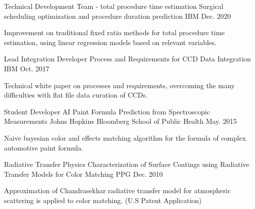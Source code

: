 

\begin{cventries}

  \cventry
    {Technical Development Team - total procedure time estimation} %
    {Surgical scheduling optimization and procedure duration prediction} %
    {IBM} %
    {Dec. 2020} %
    {
      \begin{cvcompactparagraph}
        Improvement on traditional fixed ratio methods for total procedure time estimation, using linear regression models based on relevant variables.
      \end{cvcompactparagraph}
    }

  \cventry
    {Lead Integration Developer} %
    {Process and Requirements for CCD Data Integration} %
    {IBM} %
    {Oct. 2017} %
    {
      \begin{cvcompactparagraph}
        Technical white paper on processes and requirements, overcoming the many difficulties with flat file data curation of CCDs.
      \end{cvcompactparagraph}
    }

  \cventry
    {Student Developer} %
    {AI Paint Formula Prediction from Spectroscopic Measurements} %
    {Johns Hopkins Bloomberg School of Public Health} %
    {May. 2015} %
    {
      \begin{cvcompactparagraph}
        Naive bayesian color and effects matching algorithm for the formula of complex automotive paint formula.
      \end{cvcompactparagraph}
    }

  \cventry
    {Radiative Transfer Physics} %
    {Characterization of Surface Coatings using Radiative Transfer Models for Color Matching} %
    {PPG} %
    {Dec. 2010} %
    {
      \begin{cvcompactparagraph}
        Approximation of Chandrasekhar radiative transfer model for atmospheric scattering is applied to color matching.  (U.S Patent Application)
      \end{cvcompactparagraph}
    }


\end{cventries}

